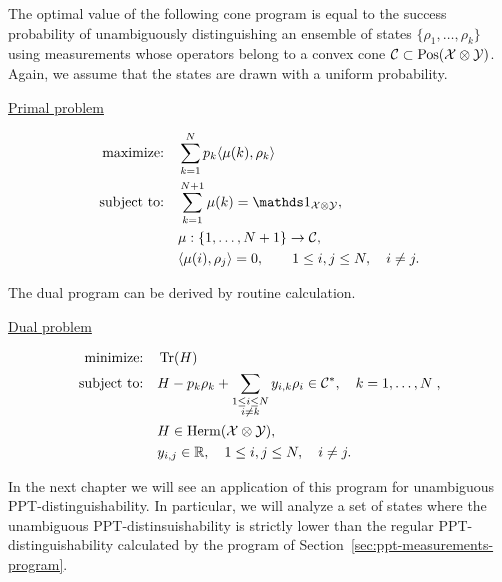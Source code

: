The optimal value of the following cone program is equal to the success 
probability of unambiguously distinguishing an ensemble of states 
$\{ \rho_{1}, \ldots, \rho_{k} \}$ using measurements whose operators belong
to a convex cone $\mathcal{C} \subset \mathrm{Pos}(\mathcal{X}\otimes\mathcal{Y})$.
Again, we assume that the states are drawn with a uniform probability.
\begin{center}
    \centerline{\underline{Primal problem}}\vspace{-4mm}
    \begin{align}
      \text{maximize:}\quad & \sum_{k = 1}^N p_{k}\ip{\mu(k)}{\rho_{k}}\notag\\
      \text{subject to:}\quad & \sum_{k=1}^{N+1} \mu(k)= \I_{\X\otimes\Y}, \label{sdp-primal-unambiguous}\\
      & \mu : \{1, \ldots, N+1\} \rightarrow \C, \notag\\
      & \ip{\mu(i)}{\rho_{j}} = 0, \qquad 1 \leq i,j \leq N, \quad i \neq j. \notag
    \end{align}
\end{center}
The dual program can be derived by routine calculation.
\begin{center}
    \centerline{\underline{Dual problem}}\vspace{-4mm}
    \begin{align}
      \text{minimize:}\quad & \operatorname{Tr}(H)\notag\\
      \text{subject to:}\quad & H - p_{k}\rho_{k} + \sum_{\substack{1\leq i \leq N \\ i\neq k}}
          y_{i,k}\rho_{i} \in \mathcal{C}^{\ast}, \quad k=1,\ldots,N \; ,\label{sdp-dual-unambiguous}\\
      & H \in \mathrm{Herm}(\mathcal{X}\otimes\mathcal{Y}),\notag\\
      & y_{i,j} \in \mathbb{R}, \quad 1 \leq i,j \leq N, \quad i \neq j.\notag
    \end{align}
\end{center}
In the next chapter we will see an application of this program for unambiguous 
PPT-distinguishability. In particular, we will analyze a set of states where 
the unambiguous PPT-distinsuishability is strictly lower than the regular 
PPT-distinguishability calculated by the program of Section~\ref{sec:ppt-measurements-program}. 